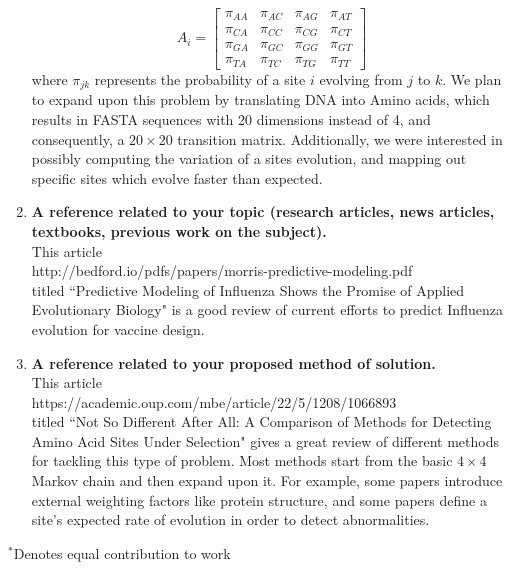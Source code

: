 \documentclass{article}
\begin{document}
\begin{enumerate}
    \[
    A_i =
        \begin{bmatrix}
            \pi_{AA} & \pi_{AC} & \pi_{AG} & \pi_{AT} \\
            \pi_{CA} & \pi_{CC} & \pi_{CG} & \pi_{CT} \\
            \pi_{GA} & \pi_{GC} & \pi_{GG} & \pi_{GT} \\
            \pi_{TA} & \pi_{TC} & \pi_{TG} & \pi_{TT}
        \end{bmatrix}
    \]
    where $\pi_{jk}$ represents the probability of a site $i$ evolving from $j$ to $k$. We plan to expand upon this problem by translating DNA into Amino acids, which results in FASTA sequences with 20 dimensions instead of 4, and consequently, a $20 \times 20$ transition matrix. Additionally, we were interested in possibly computing the variation of a sites evolution, and mapping out specific sites which evolve faster than expected.
    \item \textbf{A reference related to your topic (research articles, news articles, textbooks, previous work on the subject).}\\ This article
    \\ http://bedford.io/pdfs/papers/morris-predictive-modeling.pdf \\ titled ``Predictive Modeling of Influenza Shows the Promise of Applied Evolutionary Biology" is a good review of current efforts to predict Influenza evolution for vaccine design.
    \item \textbf{A reference related to your proposed method of solution.}\\ This article \\ https://academic.oup.com/mbe/article/22/5/1208/1066893 \\
    titled ``Not So Different After All: A Comparison of Methods for Detecting Amino Acid Sites Under Selection" gives a great review of different methods for tackling this type of problem. Most methods start from the basic $4 \times 4$ Markov chain and then expand upon it. For example, some papers introduce external weighting factors like protein structure, and some papers define a site's expected rate of evolution in order to detect abnormalities.
\end{enumerate}
\newpage
\maketitle
\footnotesize{$^*$Denotes equal contribution to work}\\
\end{document}

